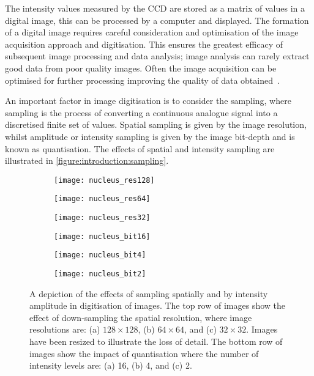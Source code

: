 The intensity values measured by the CCD are stored as a matrix of values in a digital image, this can be processed by a computer and displayed. The formation of a digital image requires careful consideration and optimisation of the image acquisition approach and digitisation. This ensures the greatest efficacy of subsequent image processing and data analysis; image analysis can rarely extract good data from poor quality images. Often the image acquisition can be optimised for further processing improving the quality of data obtained~\cite{Roeder2012}.

An important factor in image digitisation is to consider the sampling, where sampling is the process of converting a continuous analogue signal into a discretised finite set of values. Spatial sampling is given by the image resolution, whilst amplitude or intensity sampling is given by the image bit-depth and is known as quantisation. The effects of spatial and intensity sampling are illustrated in \autoref{figure:introduction:sampling}.

\begin{figure}[htbp!]\centering
	\begin{subfigure}[b]{0.32\linewidth}
		\centering
		\texttt{[image: nucleus\_res128]}
		\caption{}
		\label{figure:introduction:sampling:res128}
	\end{subfigure}
	\begin{subfigure}[b]{0.32\linewidth}
		\centering
		\texttt{[image: nucleus\_res64]}
		\caption{}
		\label{figure:introduction:sampling:res64}
	\end{subfigure}
	\begin{subfigure}[b]{0.32\linewidth}
		\centering
		\texttt{[image: nucleus\_res32]}
		\caption{}
		\label{figure:introduction:sampling:res32}
	\end{subfigure}
	\begin{subfigure}[b]{0.32\linewidth}
		\centering
		\texttt{[image: nucleus\_bit16]}
		\caption{}
		\label{figure:introduction:sampling:bit16}
	\end{subfigure}
	\begin{subfigure}[b]{0.32\linewidth}
		\centering
		\texttt{[image: nucleus\_bit4]}
		\caption{}
		\label{figure:introduction:sampling:bit4}
	\end{subfigure}
	\begin{subfigure}[b]{0.32\linewidth}
		\centering
		\texttt{[image: nucleus\_bit2]}
		\caption{}
		\label{figure:introduction:sampling:bit2}
	\end{subfigure}
\caption[Sampling in digitisation]{A depiction of the effects of sampling spatially and by intensity amplitude in digitisation of images. The top row of images show the effect of down-sampling the spatial resolution, where image resolutions are: (a) $128 \times 128$, (b) $64 \times 64$, and (c) $32 \times 32$. Images have been resized to illustrate the loss of detail. The bottom row of images show the impact of quantisation where the number of intensity levels are: (a) 16, (b) 4, and (c) 2.}
\label{figure:introduction:sampling}
\end{figure}

